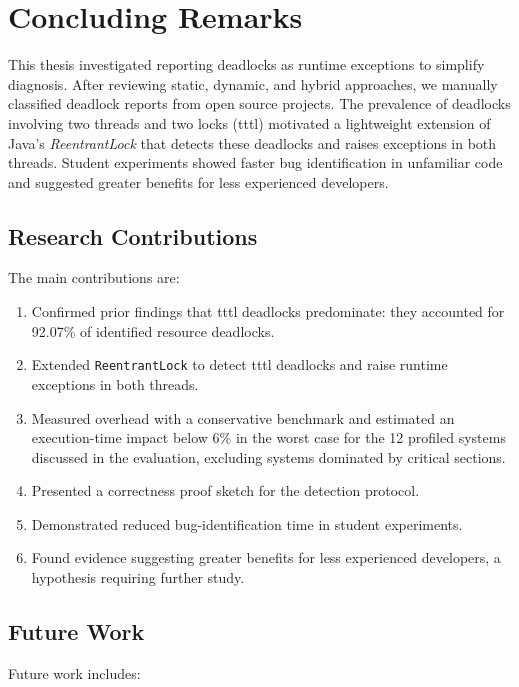 \chapter{Concluding Remarks}
\label{conclusion}

This thesis investigated reporting deadlocks as runtime exceptions to simplify diagnosis.
After reviewing static, dynamic, and hybrid approaches, we manually classified deadlock reports from open source projects.
The prevalence of deadlocks involving two threads and two locks (\ac{tttl}) motivated a lightweight extension of Java's \emph{ReentrantLock} that detects these deadlocks and raises exceptions in both threads.
Student experiments showed faster bug identification in unfamiliar code and suggested greater benefits for less experienced developers.

\section{Research Contributions}

The main contributions are:

\begin{enumerate}
\item Confirmed prior findings that \ac{tttl} deadlocks predominate: they accounted for 92.07\% of identified resource deadlocks.
\item Extended {\tt ReentrantLock} to detect \ac{tttl} deadlocks and raise runtime exceptions in both threads.
\item Measured overhead with a conservative benchmark and estimated an execution-time impact below 6\% in the worst case for the 12 profiled systems discussed in the evaluation, excluding systems dominated by critical sections.
\item Presented a correctness proof sketch for the detection protocol.
\item Demonstrated reduced bug-identification time in student experiments.
\item Found evidence suggesting greater benefits for less experienced developers, a hypothesis requiring further study.
\end{enumerate}

\section{Future Work}

Future work includes:

